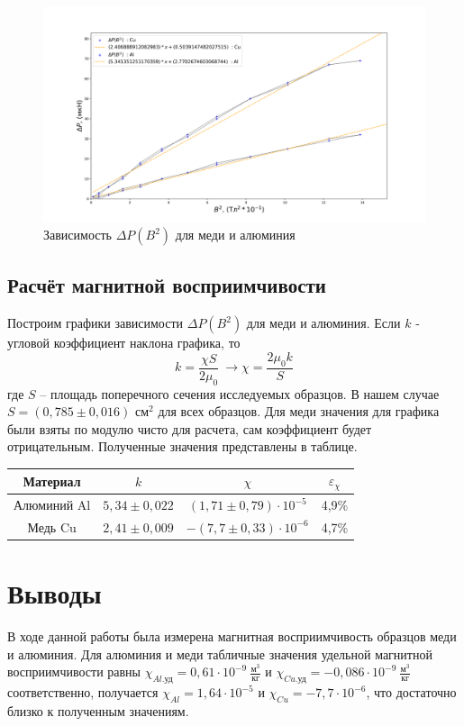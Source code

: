 \documentclass{lab}
\begin{document}
\begin{figure}[h!]
    \centering
    \includegraphics[width = \textwidth]{graph.png}
    \caption{Зависимость $\Delta P(B^2)$ для меди и алюминия}
\end{figure}
\subsection*{Расчёт магнитной восприимчивости}
Построим графики зависимости $\Delta P(B^2)$ для меди и алюминия. Если $k$ - угловой коэффициент наклона графика, то
\[k = \frac{\chi S}{2\mu_0} \ \rightarrow \chi = \frac{2\mu_0 k}{S}\]
где $ S $ -- площадь поперечного сечения исследуемых образцов. В нашем случае $ S = (0,785 \pm 0,016) $ см$ ^2 $ для всех образцов.
Для меди значения для графика были взяты по модулю чисто для расчета, сам коэффициент будет отрицательным. Полученные значения представлены в таблице.

\begin{table}[h!]
    \centering
    \begin{tabular}{|c|c|c|c|}
        \hline
        Материал & $k$ & $\chi$ & $\varepsilon_{\chi}$ \\ \hline
        Алюминий Al & $5,34 \pm 0,022$ & $(1,71 \pm 0,79) \cdot 10^{-5}$ & 4,9\% \\ \hline
        Медь Cu & $2,41 \pm 0,009$ & $-(7,7 \pm 0,33) \cdot 10^{-6}$ & 4,7\% \\ \hline
    \end{tabular}
\end{table}
\section*{Выводы}

В ходе данной работы была измерена магнитная восприимчивость образцов меди и алюминия. Для алюминия и меди табличные значения удельной магнитной восприимчивости равны $ \chi_{Al.\text{уд}} = 0,61\cdot 10^{-9} \ \frac{\text{м}^3}{\text{кг}}$ и $ \chi_{Cu.\text{уд}} = -0,086 \cdot 10^{-9} \ \frac{\text{м}^3}{\text{кг}} $ соответственно, получается $\chi_{Al} = 1,64 \cdot 10^{-5}$ и $\chi_{Cu} = -7,7 \cdot 10^{-6}$, что достаточно близко к полученным значениям.
\end{document}
